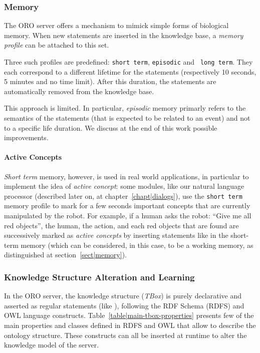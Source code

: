 \subsubsection{Memory}
\label{sect|oroserver-memory}

The ORO server offers a mechanism to mimick simple forms of biological memory.
When new statements are inserted in the knowledge base, a \emph{memory profile}
can be attached to this set.

Three such profiles are predefined: {\tt short term}, {\tt episodic} and {\tt
long term}. They each correspond to a different lifetime for the statements
(respectively 10 seconds, 5 minutes and no time limit). After this duration,
the statements are automatically removed from the knowledge base.

This approach is limited. In particular, \emph{episodic} memory primarly refers
to the semantics of the statements (that is expected to be related to an event)
and not to a specific life duration. We discuss at the end of this work possible
improvements.

\paragraph{Active Concepts} \emph{Short term} memory, however, is used in real
world applications, in particular to implement the idea of \emph{active
concept}: some modules, like our natural language processor (described later
on, at chapter~\ref{chapt|dialogs}), use the {\tt short term} memory profile to
mark for a few seconds important concepts that are currently manipulated by the
robot. For example, if a human asks the robot: ``Give me all red objects'', the
human, the  action, and each red objects that are found are
successively marked as \emph{active concepts} by inserting statements like
 in the short-term memory (which can be
considered, in this case, to be a working memory, as distinguished at
section~\ref{sect|memory}).


\subsubsection{Knowledge Structure Alteration and Learning}

In the ORO server, the knowledge structure (\emph{TBox}) is purely declarative
and asserted as regular statements (like ), following the RDF Schema (RDFS) and OWL language constructs.
Table~\ref{table|main-tbox-properties} presents few of the main properties and
classes defined in RDFS and OWL that allow to describe the ontology
structure. These constructs can all be inserted at runtime to alter the
knowledge model of the server.

